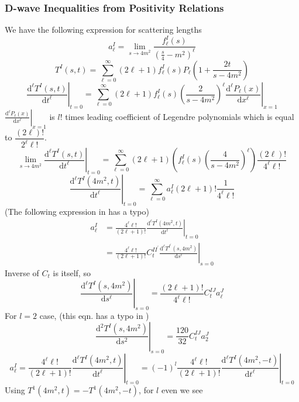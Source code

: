 ﻿\documentclass[12pt,a4paper]{article}
\begin{document}
\subsubsection{D-wave Inequalities from Positivity Relations}
We have the following expression for scattering lengths
$$
a_{\ell}^{I}=\lim _{s \rightarrow 4 m^{2}} \frac{f_{\ell}^{I}(s)}{\left(\frac{s}{4}-m^{2}\right)^{\ell}}
$$
$$
T^{I}(s, t)=\sum_{\ell=0}^{\infty}(2 \ell+1) f_{\ell}^{I}(s) P_{\ell}\left(1+\frac{2 t}{s-4 m^{2}}\right)
$$
$$
\left.\frac{\mathrm{d}^{\ell} T^{I}\left(s, t\right)}{\mathrm{d} t^{\ell}}\right|_{t=0}=\sum_{\ell=0}^{\infty}(2 \ell+1) f_{\ell}^{I}(s)\left(\frac{2}{s-4 m^{2}}\right)^{\ell}\left.\frac{\mathrm{d}^{\ell} P_{\ell}\left(x\right)}{\mathrm{d} x^{\ell}}\right|_{x=1}
$$
$\left.\frac{\mathrm{d}^{\ell} P_{\ell}\left(x\right)}{\mathrm{d} x^{\ell}}\right|_{x=1}$ is $l!$ times leading coefficient of Legendre polynomials which is equal to $\dfrac{(2\ell)!}{2^{\ell} \ell!}$.
$$
\lim _{s \rightarrow 4 m^{2}}\left.\frac{\mathrm{d}^{\ell} T^{I}\left(s, t\right)}{\mathrm{d} t^{\ell}}\right|_{t=0}=\sum_{\ell=0}^{\infty}(2 \ell+1) \left(f_{\ell}^{I}(s)\left(\frac{4}{s-4 m^{2}}\right)^{\ell}\right)\frac{(2\ell)!}{4^{\ell} \ell!}
$$
$$
\left.\frac{\mathrm{d}^{\ell} T^{I}\left(4 m^{2}, t\right)}{\mathrm{d} t^{\ell}}\right|_{t=0}=\sum_{\ell=0}^{\infty}a_{\ell}^{I}(2 \ell+1)! \frac{1}{4^{\ell} \ell!}
$$
(The following expression in \cite{6} has a typo)
$$
\begin{aligned}
a_{\ell}^{I} &=\left.\frac{4^{\ell} \ell !}{(2 \ell+1)!} \frac{\mathrm{d}^{\ell} T^{I}\left(4 m^{2}, t\right)}{\mathrm{d} t^{\ell}}\right|_{t=0} \\
&=\left.\frac{4^{\ell} \ell !}{(2 \ell+1)!} C_{t}^{I I^{\prime}} \frac{\mathrm{d}^{\ell} T^{I^{\prime}}\left(s, 4 m^{2}\right)}{\mathrm{d} s^{\ell}}\right|_{s=0}
\end{aligned}
$$
Inverse of $C_{t}$ is itself, so
$$
\left.\frac{\mathrm{d}^{\ell} T^{I}\left(s, 4 m^{2}\right)}{\mathrm{d} s^{\ell}}\right|_{s=0}=\frac{(2 \ell+1)!}{4^{\ell} \ell !} C_{t}^{I J} a_{\ell}^{J}
$$
For $l=2$ case, (this eqn. has a typo in \cite{6})
$$
\left.\frac{\mathrm{d}^{2} T^{I}\left(s, 4 m^{2}\right)}{\mathrm{d} s^{2}}\right|_{s=0}=\frac{120}{32} C_{t}^{I J} a_{2}^{J}
$$
$$
a_{\ell}^{I}=\left.\frac{4^{\ell} \ell !}{(2 \ell+1)!} \frac{\mathrm{d}^{\ell} T^{I}\left(4 m^{2}, t\right)}{\mathrm{d} t^{\ell}}\right|_{t=0}=\left.(-1)^{l}\frac{4^{\ell} \ell !}{(2 \ell+1)!} \frac{\mathrm{d}^{\ell} T^{I}\left(4 m^{2}, -t\right)}{\mathrm{d} t^{\ell}}\right|_{t=0}
$$
Using $T^{1}\left(4 m^{2}, t\right)=-T^{1}\left(4 m^{2},-t\right)$, for $l$ even we see
\end{document}
